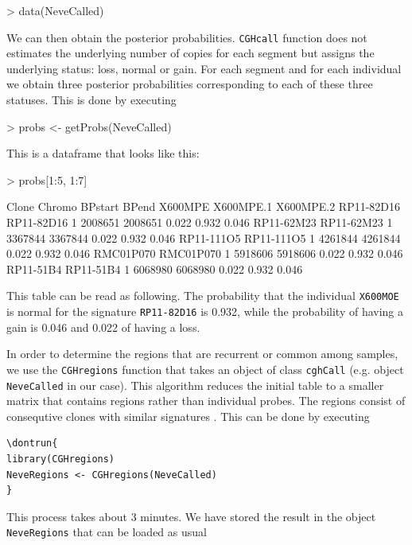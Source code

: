 \documentclass[11pt]{article}
\begin{document}
\begin{Schunk}
\begin{Sinput}
> data(NeveCalled)
\end{Sinput}
\end{Schunk}

%
We can then obtain the posterior probabilities. {\tt CGHcall} function does not estimates the underlying number of copies for each 
segment but assigns the underlying status: loss, normal or gain. For each segment and for each individual we obtain three posterior 
probabilities corresponding to each of these three statuses. This is done by executing
%

\begin{Schunk}
\begin{Sinput}
> probs <- getProbs(NeveCalled)
\end{Sinput}
\end{Schunk}

%
This is a dataframe that looks like this:
%

\begin{Schunk}
\begin{Sinput}
> probs[1:5, 1:7]
\end{Sinput}
\begin{Soutput}
                Clone Chromo BPstart   BPend X600MPE X600MPE.1 X600MPE.2
RP11-82D16 RP11-82D16      1 2008651 2008651   0.022     0.932     0.046
RP11-62M23 RP11-62M23      1 3367844 3367844   0.022     0.932     0.046
RP11-111O5 RP11-111O5      1 4261844 4261844   0.022     0.932     0.046
RMC01P070   RMC01P070      1 5918606 5918606   0.022     0.932     0.046
RP11-51B4   RP11-51B4      1 6068980 6068980   0.022     0.932     0.046
\end{Soutput}
\end{Schunk}

%
This table can be read as following. The probability that the  individual {\tt X600MOE} is normal for the signature {\tt RP11-82D16} 
is 0.932, while the probability of having a gain is 0.046 and 0.022 of having a loss.

In order to determine the regions that are recurrent or common among samples, we use the {\tt CGHregions} function that takes an object 
of class {\tt cghCall} (e.g. object {\tt NeveCalled} in our case). This algorithm reduces the initial table to a smaller matrix that 
contains regions rather than individual probes. The regions consist of consequtive clones with similar signatures \cite{WieWie07}. 
This can be done by executing
%
\begin{verbatim}
\dontrun{
library(CGHregions)
NeveRegions <- CGHregions(NeveCalled)
}
\end{verbatim}
%
This process takes about 3 minutes. We have stored the result in the object {\tt NeveRegions} that can be loaded as usual
%
\end{document}
